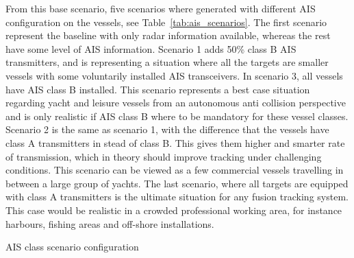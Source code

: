 From this base scenario, five scenarios where generated with different AIS configuration on the vessels, see Table~\ref{tab:ais_scenarios}. The first scenario represent the baseline with only radar information available, whereas the rest have some level of AIS information. Scenario 1 adds 50\% class B AIS transmitters, and is representing a situation where all the targets are smaller vessels with some voluntarily installed AIS transceivers. In scenario 3, all vessels have AIS class B installed. This scenario represents a best case situation regarding yacht and leisure vessels from an autonomous anti collision perspective and is only realistic if AIS class B where to be mandatory for these vessel classes. Scenario 2 is the same as scenario 1, with the difference that the vessels have class A transmitters in stead of class B. This gives them higher and smarter rate of transmission, which in theory should improve tracking under challenging conditions. This scenario can be viewed as a few commercial vessels travelling in between a large group of yachts. The last scenario, where all targets are equipped with class A transmitters is the ultimate situation for any fusion tracking system. This case would be realistic in a crowded professional working area, for instance harbours, fishing areas and off-shore installations.
\begin{table}
\centering
{}
\caption{AIS class scenario configuration}\label{tab:ais_scenarios}
\end{table}

